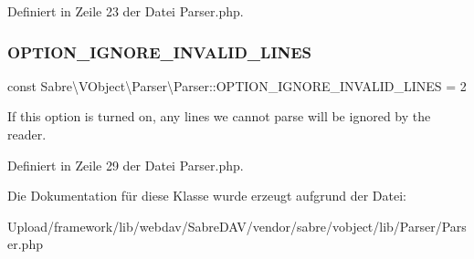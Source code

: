 Definiert in Zeile 23 der Datei Parser.\+php.

\mbox{\label{class_sabre_1_1_v_object_1_1_parser_1_1_parser_a6252ac80a839d241e57d399b4f668594}} 
\subsubsection{\texorpdfstring{O\+P\+T\+I\+O\+N\+\_\+\+I\+G\+N\+O\+R\+E\+\_\+\+I\+N\+V\+A\+L\+I\+D\+\_\+\+L\+I\+N\+ES}{OPTION\_IGNORE\_INVALID\_LINES}}
{\footnotesize\ttfamily const Sabre\textbackslash{}\+V\+Object\textbackslash{}\+Parser\textbackslash{}\+Parser\+::\+O\+P\+T\+I\+O\+N\+\_\+\+I\+G\+N\+O\+R\+E\+\_\+\+I\+N\+V\+A\+L\+I\+D\+\_\+\+L\+I\+N\+ES = 2}

If this option is turned on, any lines we cannot parse will be ignored by the reader. 

Definiert in Zeile 29 der Datei Parser.\+php.



Die Dokumentation für diese Klasse wurde erzeugt aufgrund der Datei\+:\begin{DoxyCompactItemize}
\item 
Upload/framework/lib/webdav/\+Sabre\+D\+A\+V/vendor/sabre/vobject/lib/\+Parser/Parser.\+php\end{DoxyCompactItemize}
